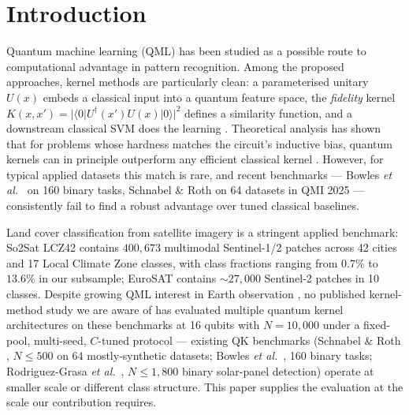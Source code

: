 \documentclass[pdflatex,sn-mathphys-num]{sn-jnl}
\theoremstyle{thmstyleone}
\theoremstyle{thmstyletwo}
\theoremstyle{thmstylethree}
\begin{document}

\maketitle

\section{Introduction}\label{sec:intro}

Quantum machine learning (QML) has been studied as a possible route to
computational advantage in pattern recognition. Among the proposed
approaches, kernel methods are particularly clean: a parameterised unitary
$U(x)$ embeds a classical input into a quantum feature space, the
\emph{fidelity} kernel
$K(x,x')=|\langle 0|U^\dagger(x')U(x)|0\rangle|^2$ defines a similarity
function, and a downstream classical SVM does the learning
\cite{havlicek2019,schuld2019}. Theoretical analysis has shown that for
problems whose hardness matches the circuit's inductive bias, quantum
kernels can in principle outperform any efficient classical kernel
\cite{liu2021}. However, for typical applied datasets this match is rare,
and recent benchmarks --- Bowles \emph{et al.}\ \cite{bowles2024} on 160
binary tasks, Schnabel \& Roth \cite{schnabel2025} on 64 datasets in QMI
2025 --- consistently fail to find a robust advantage over tuned classical
baselines.

Land cover classification from satellite imagery is a stringent applied
benchmark: So2Sat LCZ42 \cite{zhu2020} contains $400{,}673$ multimodal
Sentinel-1/2 patches across 42 cities and 17 Local Climate Zone classes,
with class fractions ranging from $0.7\%$ to $13.6\%$ in our subsample;
EuroSAT \cite{helber2019} contains $\sim\!27{,}000$ Sentinel-2 patches in
10 classes. Despite growing QML interest in Earth observation
\cite{rodriguez2025}, no published kernel-method study we are aware of
has evaluated multiple quantum kernel architectures on these
benchmarks at 16 qubits with $N=10{,}000$ under a fixed-pool, multi-seed,
$C$-tuned protocol --- existing QK benchmarks
(Schnabel \& Roth \cite{schnabel2025}, $N\le 500$ on 64 mostly-synthetic
datasets; Bowles \emph{et al.}\ \cite{bowles2024}, 160 binary tasks;
Rodriguez-Grasa \emph{et al.}\ \cite{rodriguez2025}, $N\!\le\!1{,}800$
binary solar-panel detection) operate at smaller scale or different
class structure. This paper supplies the evaluation at the scale our
contribution requires.
\end{document}
